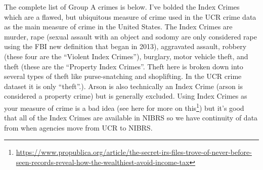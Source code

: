 \documentclass[
]{krantz}
\renewcommand{\href}[2]{#2\footnote{\url{#1}}}
\begin{document}
The complete list of Group A crimes is below. I've bolded
the Index Crimes which are a flawed, but ubiquitous measure
of crime used in the UCR crime data as the main measure of
crime in the United States. The Index Crimes are murder,
rape (sexual assault with an object and sodomy are only
considered rape using the FBI new definition that began in
2013), aggravated assault, robbery (these four are the
``Violent Index Crimes''), burglary, motor vehicle theft,
and theft (these are the ``Property Index Crimes''. Theft
here is broken down into several types of theft like
purse-snatching and shoplifting. In the UCR crime dataset it
is only ``theft''.). Arson is also technically an Index
Crime (arson is considered a property crime) but is
generally excluded. Using Index Crimes as your measure of
crime is a bad idea (see
\href{https://www.propublica.org/article/the-secret-irs-files-trove-of-never-before-seen-records-reveal-how-the-wealthiest-avoid-income-tax}{here
for more on this}) but it's good that all of the Index
Crimes are available in NIBRS so we have continuity of data
from when agencies move from UCR to NIBRS.
\end{document}
